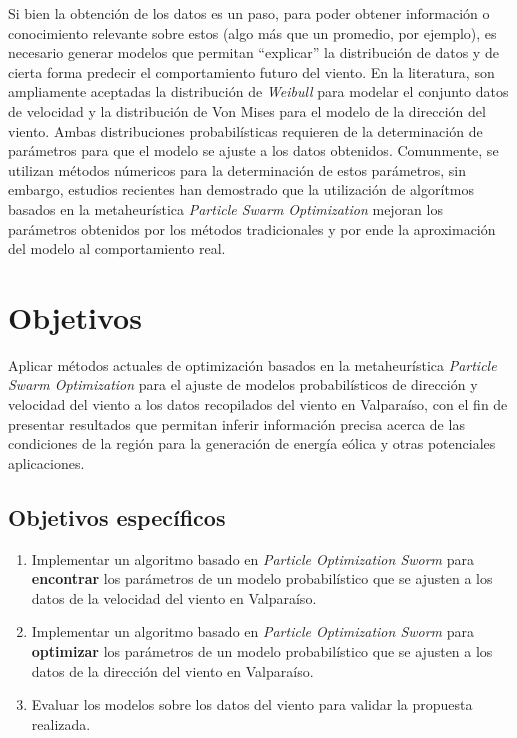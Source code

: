 Si bien la obtención de los datos es un paso, para poder obtener información o conocimiento relevante sobre estos (algo más que un promedio, por ejemplo), es necesario generar modelos que permitan ``explicar'' la distribución de datos y de cierta forma predecir el comportamiento futuro del viento. En la literatura, son ampliamente aceptadas la distribución de \emph{Weibull} para modelar el conjunto datos de velocidad y la distribución de Von Mises para el modelo de la dirección del viento. Ambas distribuciones probabilísticas requieren de la determinación de parámetros para que el modelo se ajuste a los datos obtenidos. Comunmente, se utilizan métodos númericos para la determinación de estos parámetros, sin embargo, estudios recientes han demostrado que la utilización de algorítmos basados en la metaheurística \emph{Particle Swarm Optimization} mejoran los parámetros obtenidos por los métodos tradicionales y por ende la aproximación del modelo al comportamiento real.\\ 

\section{Objetivos}
Aplicar métodos actuales de optimización basados en la metaheurística \emph{Particle Swarm Optimization} para el ajuste de modelos probabilísticos de dirección y velocidad del viento a los datos recopilados del viento en Valparaíso, con el fin de presentar resultados que permitan inferir información precisa acerca de las condiciones de la región para la generación de energía eólica y otras potenciales aplicaciones.

\subsection{Objetivos específicos}
\begin{enumerate}
    \item Implementar un algoritmo basado en \emph{Particle Optimization Sworm} para \textbf{encontrar} los parámetros de un modelo probabilístico que se ajusten a los datos de la velocidad del viento en Valparaíso. 
    \item Implementar un algoritmo basado en \emph{Particle Optimization Sworm} para \textbf{optimizar} los parámetros de un modelo probabilístico que se ajusten a los datos de la dirección del viento en Valparaíso.
    \item Evaluar los modelos sobre los datos del viento para validar la propuesta realizada.
\end{enumerate}

